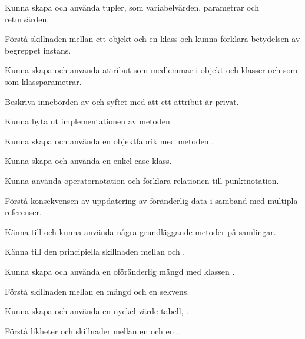 
\Exercise{\ExeWeekFOUR}

\begin{Goals}
\item Kunna skapa och använda tupler, som variabelvärden, parametrar och returvärden.

\item Förstå skillnaden mellan ett objekt och en klass och kunna förklara betydelsen av begreppet instans.

\item Kunna skapa och använda attribut som medlemmar i objekt och klasser och som som klassparametrar.

\item Beskriva innebörden av och syftet med att ett attribut är privat.

\item Kunna byta ut implementationen av metoden .

\item Kunna skapa och använda en objektfabrik med metoden .

\item Kunna skapa och använda en enkel case-klass.

\item Kunna använda operatornotation och förklara relationen till punktnotation.

\item Förstå konsekvensen av uppdatering av föränderlig data i samband med multipla referenser.

\item Känna till och kunna använda några grundläggande metoder på samlingar.

\item Känna till den principiella skillnaden mellan  och .

\item Kunna skapa och använda en oföränderlig mängd med klassen .

\item Förstå skillnaden mellan en mängd och en sekvens.

\item Kunna skapa och använda en nyckel-värde-tabell, .

\item Förstå likheter och skillnader mellan en  och en .
\end{Goals}


